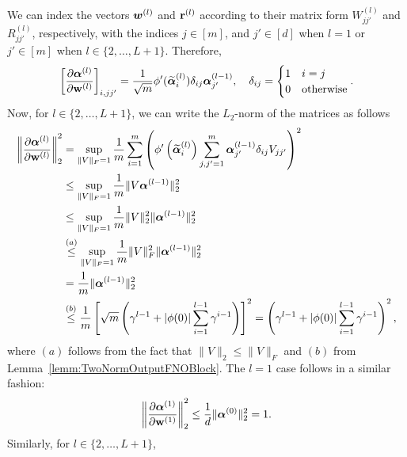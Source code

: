     \proof
    We can index the vectors ${\bm{w}}^{(l)}$ and $\mathbf{r}^{(l)}$ according to their matrix form $W^{(l)}_{jj'}$ and $R^{(l)}_{jj'}$, respectively, with the indices $j\in [m]$, and $j'\in [d]$ when $l=1$ or $j'\in [m]$ when $l\in \{2,\dots,L+1\}$. Therefore,
    \begin{equation*}
        \left[\frac{\partial \boldsymbol{\alpha}^{(l)}}{\partial \mathbf{w}^{(l)}}\right]_{i, j j^{\prime}} = \frac{1}{\sqrt{m}}\phi' (\widetilde{\boldsymbol{\alpha}}^{(l)}_i)\delta_{ij}\boldsymbol{\alpha}^{(l-1)}_{j'},
        \quad \delta_{ij} = \begin{cases}
            1 &{i=j}\\
            0 &\text{otherwise}
        \end{cases}.
    \end{equation*}
    Now, for $l\in \{2,\dots,L+1\}$, we can write the $L_2$-norm of the matrices as follows
    \begin{align*}
        \left\|\frac{\partial \boldsymbol{\alpha}^{(l)}}{\partial \mathbf{w}^{(l)}}\right\|_2^2
        &=
        \sup _{\|V\|_F=1} \frac{1}{m} \sum_{i=1}^m\left(\phi^{\prime}\left(\widetilde{\boldsymbol{\alpha}}_i^{(l)}\right) \sum_{j, j^{\prime}=1}^m \boldsymbol{\alpha}_{j^{\prime}}^{(l-1)} \delta_{ij} V_{j j^{\prime}}\right)^2\\
        &\leq \sup_{\|V\|_F = 1} \frac{1}{m} \| V\boldsymbol{\alpha}^{(l-1)}\|_2^2\\
        & \leq \sup_{\|V\|_F = 1}\frac{1}{m} \|V\|_2^2 \|\boldsymbol{\alpha}^{(l-1)}\|_2^2 \\ 
        & \overset{(a)}{\leq} \sup_{\|V\|_F = 1}\frac{1}{m} \|V\|_F^2 \|\boldsymbol{\alpha}^{(l-1)}\|_2^2 \\
        & = \frac{1}{m}\|\boldsymbol{\alpha}^{(l-1)}\|_2^2 \\
        & \overset{(b)}{\leq} \frac{1}{m} \left[ 
            \sqrt{m}\left(\gamma^{l-1}+|\phi(0)| \sum_{i=1}^{l-1} \gamma^{i-1}\right)
        \right]^2 = \left(\gamma^{l-1}+|\phi(0)| \sum_{i=1}^{l-1} \gamma^{i-1}\right)^2,
    \end{align*}
    where $(a)$ follows from the fact that $\|V\|_2 \leq \|V\|_F$ and $(b)$ from Lemma~\ref{lemm:TwoNormOutputFNOBlock}. The $l=1$ case follows in a similar fashion:
    \begin{equation*}
        \left\|\frac{\partial \boldsymbol{\alpha}^{(1)}}{\partial \mathbf{w}^{(1)}}\right\|_2^2 \leq 
        \frac{1}{d}\|\boldsymbol{\alpha}^{(0)} \|_2^2 = 1.
    \end{equation*}
    Similarly, for $l\in\{2,\dots,L+1\}$,
